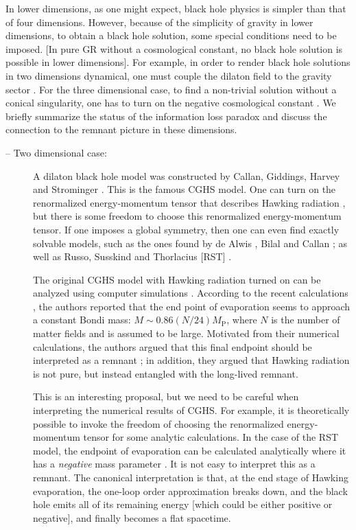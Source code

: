 \documentclass[12pt]{article}
\newcommand{\2}{$^2$}
\newcommand{\3}{$^3$}
\newcommand{\4}{$_4$}
\newcommand{\5}{$_5$}
\begin{document}
In lower dimensions, as one might expect, black hole physics is simpler than that of four dimensions. However, because of the simplicity of gravity in lower dimensions, to obtain a black hole solution, some special conditions need to be imposed. [In pure GR without a cosmological constant, no black hole solution is possible in lower dimensions]. For example, in order to render black hole solutions in two dimensions dynamical, one must couple the dilaton field to the gravity sector \cite{Callan:1992rs}. For the three dimensional case, to find a non-trivial solution without a conical singularity, one has to turn on the negative cosmological constant \cite{Banados:1992wn}. We briefly summarize the status of the information loss paradox and discuss the connection to the remnant picture in these dimensions.
\begin{description}
\item[-- Two dimensional case:] A dilaton black hole model was constructed by Callan, Giddings, Harvey and Strominger \cite{Callan:1992rs}. This is the famous CGHS model. One can turn on the renormalized energy-momentum tensor that describes Hawking radiation \cite{Davies:1976ei}, but there is some freedom to choose this renormalized energy-momentum tensor. If one imposes a global symmetry, then one can even find exactly solvable models, such as the ones found by de Alwis \cite{deAlwis:1992hv}, Bilal and Callan \cite{Bilal:1992kv}; as well as Russo, Susskind and Thorlacius [RST] \cite{Russo:1992ax}.

The original CGHS model with Hawking radiation turned on can be analyzed using computer simulations \cite{Piran:1993tq}. According to the recent calculations \cite{Ashtekar:2010qz}, the authors reported that the end point of evaporation seems to approach a constant Bondi mass: $M \sim 0.86 (N/24) M_{\mathrm{P}}$, where $N$ is the number of matter fields and is assumed to be large. Motivated from their numerical calculations, the authors argued that this final endpoint should be interpreted as a remnant \cite{Almheiri:2013wka}; in addition, they argued that Hawking radiation is not pure, but instead entangled with the long-lived remnant.

This is an interesting proposal, but we need to be careful when interpreting the numerical results of CGHS. For example, it is theoretically possible to invoke the freedom of choosing the renormalized energy-momentum tensor for some analytic calculations. In the case of the RST model, the endpoint of evaporation can be calculated analytically where it has a \emph{negative} mass parameter \cite{Russo:1992ax}. It is not easy to interpret this as a remnant. The canonical interpretation is that, at the end stage of Hawking evaporation, the one-loop order approximation breaks down, and the black hole emits all of its remaining energy [which could be either positive or negative], and finally becomes a flat spacetime.


\end{description}
\end{document}
